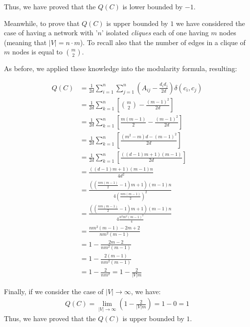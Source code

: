 \documentclass{article}
\begin{document}
\begin{enumerate}
        Thus, we have proved that the \(Q(C)\) is lower bounded by \(-1\).\newline\newline
        
        \par\noindent Meanwhile, to prove that \(Q(C)\) is upper bounded by \(1\) we have considered the case of having a network with '\(n\)' isolated \textit{cliques} each of one having \(m\) nodes (meaning that \(|V| = n \cdot m\)). To recall also that the number of edges in a clique of \(m\) nodes is equal to \(\binom{m}{2}\).\newline
        
        \par\noindent As before, we applied these knowledge into the modularity formula, resulting:
        
        \begin{align*}
            Q(C) &= \frac{1}{2d} \sum_{i=1}^{n}\sum_{j=1}^{n} \left( A_{ij} - \frac{d_{i}d_{j}}{2d} \right) \delta (c_{i},c_{j}) \\
            &= \frac{1}{2d} \sum_{k=1}^{n} \left[\binom{m}{2}-\frac{(m-1)^{2}}{2d}\right] \\
            &= \frac{1}{2d} \sum_{k=1}^{n} \left[\frac{m(m-1)}{2}-\frac{(m-1)^{2}}{2d}\right] \\
            &= \frac{1}{2d} \sum_{k=1}^{n} \left[\frac{(m^2-m)d-(m-1)^{2}}{2d}\right] \\
            &= \frac{1}{2d} \sum_{k=1}^{n} \left[\frac{((d-1)m+1)(m-1)}{2d}\right] \\
            &= \frac{((d-1)m+1)(m-1)n}{4d^{2}} \\
            &= \frac{((\frac{nm(m-1)}{2}-1)m+1)(m-1)n}{4\left(\frac{nm(m-1)}{2}\right)^{2}} \\
            &= \frac{((\frac{nm(m-1)}{2}-1)m+1)(m-1)n}{4 \frac{n^{2}m^{2}(m-1)^{2}}{4}} \\
            &= \frac{nm^{2}(m-1)-2m+2}{nm^{2}(m-1)} \\
            &= 1 - \frac{2m-2}{nm^{2}(m-1)} \\
            &= 1 - \frac{2(m-1)}{nm^{2}(m-1)} \\
            &= 1 - \frac{2}{nm^{2}} = 1 - \frac{2}{|V|m}
        \end{align*}
        
        \noindent Finally, if we consider the case of \(|V| \to \infty\), we have:
        \begin{align*}
            Q(C) = \displaystyle{\lim_{|V|\to\infty} \left(1-\frac{2}{|V|m}\right)} = 1 - 0 = 1
        \end{align*}
        Thus, we have proved that the \(Q(C)\) is upper bounded by \(1\).
        

\end{enumerate}
\end{document}
